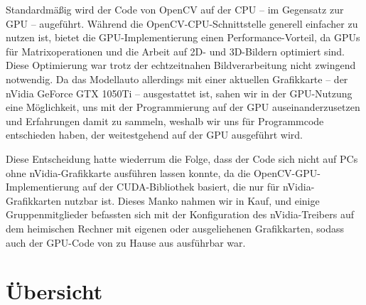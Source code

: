 \documentclass[a4paper,12pt]{report}
\begin{document}
Standardmäßig wird der Code von OpenCV auf der CPU -- im Gegensatz zur GPU -- augeführt.
Während die OpenCV-CPU-Schnittstelle generell einfacher zu nutzen ist, bietet die GPU-Implementierung einen Performance-Vorteil, da GPUs für Matrixoperationen und die Arbeit auf 2D- und 3D-Bildern optimiert sind.
Diese Optimierung war trotz der echtzeitnahen Bildverarbeitung nicht zwingend notwendig.
Da das Modellauto allerdings mit einer aktuellen Grafikkarte -- der nVidia GeForce GTX 1050Ti -- ausgestattet ist, sahen wir in der GPU-Nutzung eine Möglichkeit, uns mit der Programmierung auf der GPU auseinanderzusetzen und Erfahrungen damit zu sammeln, weshalb wir uns für Programmcode entschieden haben, der weitestgehend auf der GPU ausgeführt wird.

Diese Entscheidung hatte wiederrum die Folge, dass der Code sich nicht auf PCs ohne nVidia-Grafikkarte ausführen lassen konnte, da die OpenCV-GPU-Implementierung auf der CUDA-Bibliothek basiert, die nur für nVidia-Grafikkarten nutzbar ist.
Dieses Manko nahmen wir in Kauf, und einige Gruppenmitglieder befassten sich mit der Konfiguration des nVidia-Treibers auf dem heimischen Rechner mit eigenen oder ausgeliehenen Grafikkarten, sodass auch der GPU-Code von zu Hause aus ausführbar war.



\pagebreak

\section{Übersicht}
\end{document}

